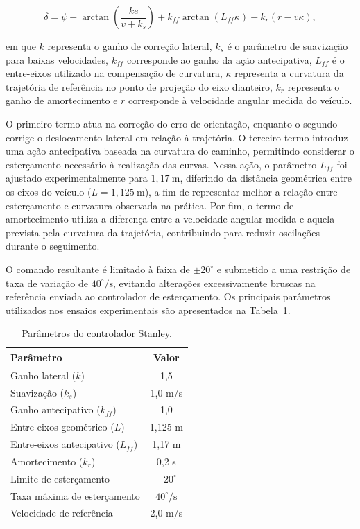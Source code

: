 \begin{equation}
\delta =
\psi
- \arctan\left(\frac{ke}{v+k_s}\right)
+ k_{ff}\arctan(L_{ff}\kappa)
- k_r(r-v\kappa),
\label{eq:stanley_modificado}
\end{equation}

em que $k$ representa o ganho de correção lateral, $k_s$ é o parâmetro de suavização para baixas velocidades, $k_{ff}$ corresponde ao ganho da ação antecipativa, $L_{ff}$ é o entre-eixos utilizado na compensação de curvatura, $\kappa$ representa a curvatura da trajetória de referência no ponto de projeção do eixo dianteiro, $k_r$ representa o ganho de amortecimento e $r$ corresponde à velocidade angular medida do veículo.

O primeiro termo atua na correção do erro de orientação, enquanto o segundo corrige o deslocamento lateral em relação à trajetória. O terceiro termo introduz uma ação antecipativa baseada na curvatura do caminho, permitindo considerar o esterçamento necessário à realização das curvas. Nessa ação, o parâmetro $L_{ff}$ foi ajustado experimentalmente para $1{,}17~\mathrm{m}$, diferindo da distância geométrica entre os eixos do veículo ($L = 1{,}125~\mathrm{m}$), a fim de representar melhor a relação entre esterçamento e curvatura observada na prática. Por fim, o termo de amortecimento utiliza a diferença entre a velocidade angular medida e aquela prevista pela curvatura da trajetória, contribuindo para reduzir oscilações durante o seguimento.

O comando resultante é limitado à faixa de $\pm20^\circ$ e submetido a uma restrição de taxa de variação de $40^\circ/\mathrm{s}$, evitando alterações excessivamente bruscas na referência enviada ao controlador de esterçamento. Os principais parâmetros utilizados nos ensaios experimentais são apresentados na Tabela~\ref{tab:parametros_stanley}.

\begin{table}[ht]
    \centering
    \caption{Parâmetros do controlador Stanley.}
    \label{tab:parametros_stanley}
    \begin{tabular}{lc}
        \hline
        \textbf{Parâmetro} & \textbf{Valor} \\
        \hline
        Ganho lateral ($k$) & 1,5 \\
        Suavização ($k_s$) & 1,0 m/s \\
        Ganho antecipativo ($k_{ff}$) & 1,0 \\
        Entre-eixos geométrico ($L$) & 1,125 m \\
        Entre-eixos antecipativo ($L_{ff}$) & 1,17 m \\
        Amortecimento ($k_r$) & 0,2 s \\
        Limite de esterçamento & $\pm20^\circ$ \\
        Taxa máxima de esterçamento & $40^\circ/\mathrm{s}$ \\
        Velocidade de referência & 2,0 m/s \\
        \hline
    \end{tabular}
\end{table}

